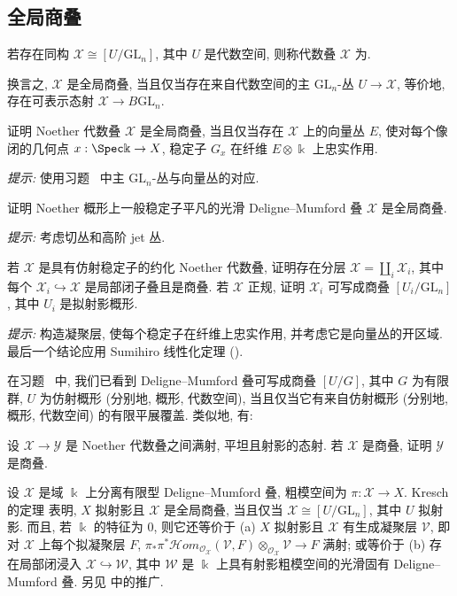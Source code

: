 \subsection{全局商叠}\label{src:7.2.1-subsection}
\begin{definition}\label{src:7.2.1}
若存在同构 $\mathcal X\cong[U/\mathrm{GL}_n]$, 其中 $U$ 是代数空间, 则称代数叠 $\mathcal X$ 为.
\end{definition}
换言之, $\mathcal X$ 是全局商叠, 当且仅当存在来自代数空间的主 $\mathrm{GL}_n$-丛 $U\to\mathcal X$, 等价地, 存在可表示态射 $\mathcal X\to B\mathrm{GL}_n$.
\begin{exercise}[重要]\label{src:7.2.2}
证明 Noether 代数叠 $\mathcal X$ 是全局商叠, 当且仅当存在 $\mathcal X$ 上的向量丛 $E$, 使对每个像闭的几何点 $x:\Spec\Bbbk\to\mathcal X$, 稳定子 $G_x$ 在纤维 $E\otimes\Bbbk$ 上忠实作用.

\textit{提示:} 使用习题~ 中主 $\mathrm{GL}_n$-丛与向量丛的对应.
\end{exercise}
\begin{exercise}\label{src:7.2.3}
证明 Noether 概形上一般稳定子平凡的光滑 Deligne--Mumford 叠 $\mathcal X$ 是全局商叠.

\textit{提示:} 考虑切丛和高阶 jet 丛.
\end{exercise}
\begin{exercise}\label{src:7.2.4}
若 $\mathcal X$ 是具有仿射稳定子的约化 Noether 代数叠, 证明存在分层 $\mathcal X=\coprod_i\mathcal X_i$, 其中每个 $\mathcal X_i\hookrightarrow\mathcal X$ 是局部闭子叠且是商叠. 若 $\mathcal X$ 正规, 证明 $\mathcal X_i$ 可写成商叠 $[U_i/\mathrm{GL}_n]$, 其中 $U_i$ 是拟射影概形.

\textit{提示:} 构造凝聚层, 使每个稳定子在纤维上忠实作用, 并考虑它是向量丛的开区域. 最后一个结论应用 Sumihiro 线性化定理 ().
\end{exercise}
在习题~ 中, 我们已看到 Deligne--Mumford 叠可写成商叠 $[U/G]$, 其中 $G$ 为有限群, $U$ 为仿射概形 (分别地, 概形, 代数空间), 当且仅当它有来自仿射概形 (分别地, 概形, 代数空间) 的有限平展覆盖. 类似地, 有:
\begin{exercise}\label{src:7.2.5}
设 $\mathcal X\to\mathcal Y$ 是 Noether 代数叠之间满射, 平坦且射影的态射. 若 $\mathcal X$ 是商叠, 证明 $\mathcal Y$ 是商叠.
\end{exercise}
\begin{remark}[拟射影叠]\label{src:7.2.6}
设 $\mathcal X$ 是域 $\Bbbk$ 上分离有限型 Deligne--Mumford 叠, 粗模空间为 $\pi:\mathcal X\to X$. Kresch 的定理 \cite[定理 5.3]{Kre09} 表明, $X$ 拟射影且 $\mathcal X$ 是全局商叠, 当且仅当 $\mathcal X\cong[U/\mathrm{GL}_n]$, 其中 $U$ 拟射影. 而且, 若 $\Bbbk$ 的特征为 $0$, 则它还等价于 (a) $X$ 拟射影且 $\mathcal X$ 有生成凝聚层 $\mathcal V$, 即对 $\mathcal X$ 上每个拟凝聚层 $F$, $\pi_*\pi^*\mathcal H\!om_{\mathcal O_{\mathcal X}}(\mathcal V,F)\otimes_{\mathcal O_{\mathcal X}}\mathcal V\to F$ 满射; 或等价于 (b) 存在局部闭浸入 $\mathcal X\hookrightarrow\mathcal W$, 其中 $\mathcal W$ 是 $\Bbbk$ 上具有射影粗模空间的光滑固有 Deligne--Mumford 叠. 另见 \cite{BOW24} 中的推广.
\end{remark}
